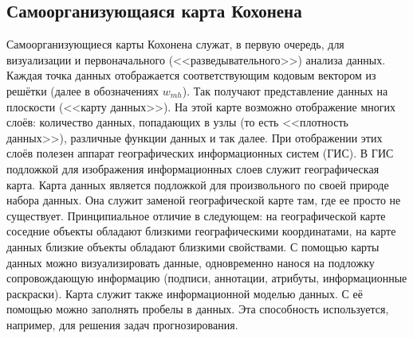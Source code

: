 \documentclass[article, 10pt]{disser}
\begin{document}
\subsection{Самоорганизующаяся карта Кохонена}
Самоорганизующиеся карты Кохонена служат, в первую очередь, для визуализации и первоначального (<<разведывательного>>) анализа данных. Каждая точка данных отображается соответствующим кодовым вектором из решётки (далее в обозначениях $w_{mh}$). Так получают представление данных на плоскости (<<карту данных>>). На этой карте возможно отображение многих слоёв: количество данных, попадающих в узлы (то есть <<плотность данных>>), различные функции данных и так далее. При отображении этих слоёв полезен аппарат географических информационных систем (ГИС). В ГИС подложкой для изображения информационных слоев служит географическая карта. Карта данных является подложкой для произвольного по своей природе набора данных. Она служит заменой географической карте там, где ее просто не существует. Принципиальное отличие в следующем: на географической карте соседние объекты обладают близкими географическими координатами, на карте данных близкие объекты обладают близкими свойствами. С помощью карты данных можно визуализировать данные, одновременно нанося на подложку сопровождающую информацию (подписи, аннотации, атрибуты, информационные раскраски). Карта служит также информационной моделью данных. С её помощью можно заполнять пробелы в данных. Эта способность используется, например, для решения задач прогнозирования.
\end{document}
